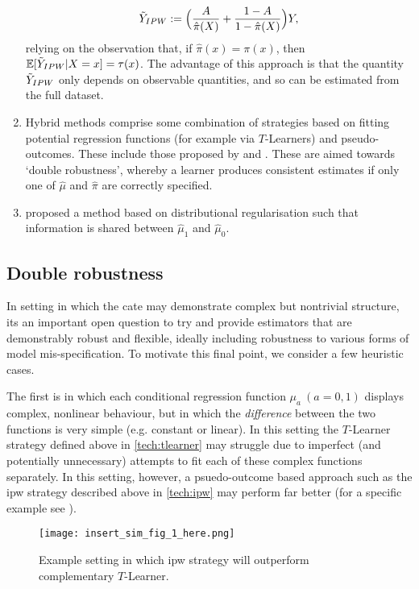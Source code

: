 \documentclass[../thesis.tex]{subfiles}
\begin{document}
\begin{enumerate}
    \[\Tilde{Y}_{IPW} := \Big(\frac{A}{\hat{\pi}(X)} + \frac{1-A}{1-\hat{\pi}(X)}\Big)Y, \]
    relying on the observation that, if $\hat{\pi}(x) = \pi(x)$, then $\mathbb{E}[\Tilde{Y}_{IPW} | X =x] = \tau(x)$. The advantage of this approach is that the quantity $\Tilde{Y}_{IPW}$ only depends on observable quantities, and so can be estimated from the full dataset.
    \item Hybrid methods comprise some combination of strategies based on fitting potential regression functions (for example via $T$-Learners) and pseudo-outcomes. These include those proposed by \citet{curth_nonparametric_2021} and \citet{kennedy_optimal_2020}. These are aimed towards `double robustness', whereby a learner produces consistent estimates if only one of $\hat{\mu}$ and $\hat{\pi}$ are correctly specified.
    \item \citet{shalit_estimating_2017} proposed a method based on distributional regularisation such that information is shared between $\hat{\mu}_1$ and $\hat{\mu}_0$.
\end{enumerate}

\subsection{Double robustness} \label{sec:doublerobustness}
In setting in which the \gls{cate} may demonstrate complex but nontrivial structure, its an important open question to try and provide estimators that are demonstrably robust and flexible, ideally including robustness to various forms of model mis-specification. To motivate this final point, we consider a few heuristic cases. 

The first is in which each conditional regression function $\mu_a \ (a=0,1)$ displays complex, nonlinear behaviour, but in which the \emph{difference} between the two functions is very simple (e.g. constant or linear). In this setting the $T$-Learner strategy defined above in \eqref{tech:tlearner} may struggle due to imperfect (and potentially unnecessary) attempts to fit each of these complex functions separately. In this setting, however, a psuedo-outcome based approach such as the \gls{ipw} strategy described above in \eqref{tech:ipw} may perform far better (for a specific example see \citealp{kennedy_towards_2022}). 

\begin{figure}[!tpb] 
\centering
\texttt{[image: insert\_sim\_fig\_1\_here.png]}
\caption{Example setting in which \gls{ipw} strategy will outperform complementary $T$-Learner.  \label{fig:insert_sim_fig_1_here}}
\end{figure}
\end{document}

